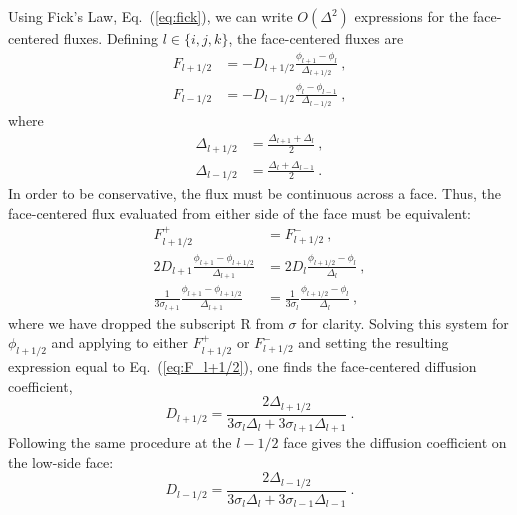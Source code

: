 \documentclass[preprint,12pt]{elsarticle}
\begin{document}
Using Fick's Law, Eq.~(\ref{eq:fick}), we can write $O(\Delta^2)$ expressions
for the face-centered fluxes.  Defining $l\in\{i,j,k\}$, the face-centered
fluxes are
\begin{align}
  F_{l+1/2} &= -D_{l+1/2}\frac{\phi_{l+1} -
    \phi_{l}}{\Delta_{l+1/2}}\:, \label{eq:F_l+1/2}\\ F_{l-1/2} &=
  -D_{l-1/2}\frac{\phi_{l} -
    \phi_{l-1}}{\Delta_{l-1/2}}\:, \label{eq:F_l-1/2}
\end{align}
where
\begin{align}
  \Delta_{l+1/2} &= \frac{\Delta_{l+1} +
    \Delta_{l}}{2}\:,\\ \Delta_{l-1/2} &= \frac{\Delta_{l} +
    \Delta_{l-1}}{2}\:.
\end{align}
In order to be conservative, the flux must be continuous across a face.  Thus,
the face-centered flux evaluated from either side of the face must be
equivalent:
\begin{equation}
  \begin{aligned}
    F_{l+1/2}^{+} &= F_{l+1/2}^{-}\:,\\ 2D_{l+1}\frac{\phi_{l+1} -
      \phi_{l+1/2}}{\Delta_{l+1}} &= 2D_{l}\frac{\phi_{l+1/2} -
      \phi_{l}}{\Delta_l}\:,\\ \frac{1}{3\sigma_{l+1}}\frac{\phi_{l+1}
      - \phi_{l+1/2}}{\Delta_{l+1}} &=
    \frac{1}{3\sigma_{l}}\frac{\phi_{l+1/2} - \phi_{l}}{\Delta_l}\:,
  \end{aligned}
\end{equation}
where we have dropped the subscript $\mathrm{R}$ from $\sigma$ for clarity.
Solving this system for $\phi_{l+1/2}$ and applying to either $F_{l+1/2}^{+}$
or $F_{l+1/2}^{-}$ and setting the resulting expression equal to
Eq.~(\ref{eq:F_l+1/2}), one finds the face-centered diffusion coefficient,
\begin{equation}
  D_{l+1/2} = \frac{2\Delta_{l+1/2}}{3\sigma_l\Delta_l +
    3\sigma_{l+1}\Delta_{l+1}}\:.
  \label{eq:D_l+1/2}
\end{equation}
Following the same procedure at the $l-1/2$ face gives the diffusion
coefficient on the low-side face:
\begin{equation}
  D_{l-1/2} = \frac{2\Delta_{l-1/2}}{3\sigma_l\Delta_l +
    3\sigma_{l-1}\Delta_{l-1}}\:.
  \label{eq:D_l-1/2} 
\end{equation}
\end{document}
